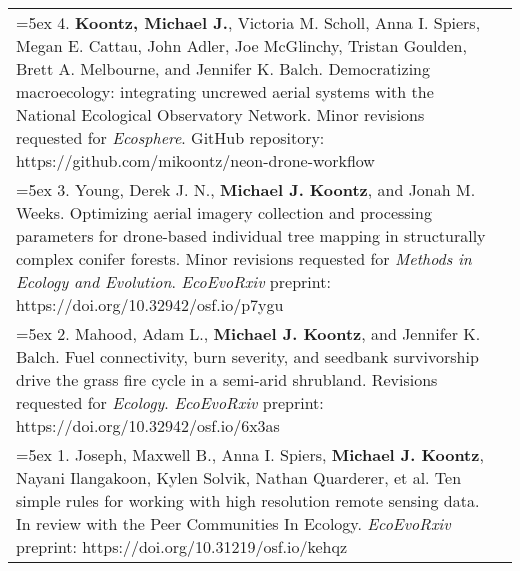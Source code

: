 \begin{longtable}{@{} >{\raggedright}p{6.10in} >{\raggedleft}X @{}}

\hangindent=5ex 4. \textbf{Koontz, Michael J.}, Victoria M. Scholl, Anna I. Spiers, Megan E. Cattau, John Adler, Joe McGlinchy, Tristan Goulden, Brett A. Melbourne, and Jennifer K. Balch. Democratizing macroecology: integrating uncrewed aerial systems with the National Ecological Observatory Network. Minor revisions requested for \emph{Ecosphere}. 
\newline GitHub repository: https://github.com/mikoontz/neon-drone-workflow & \tabularnewline

\hangindent=5ex 3. Young, Derek J. N., \textbf{Michael J. Koontz}, and Jonah M. Weeks. Optimizing aerial imagery collection and processing parameters for drone-based individual tree mapping in structurally complex conifer forests. Minor revisions requested for \emph{Methods in Ecology and Evolution}.
\newline \emph{EcoEvoRxiv} preprint: https://doi.org/10.32942/osf.io/p7ygu & \tabularnewline

\hangindent=5ex 2. Mahood, Adam L., \textbf{Michael J. Koontz}, and Jennifer K. Balch. Fuel connectivity, burn severity, and seedbank survivorship drive the grass fire cycle in a semi-arid shrubland. Revisions requested for \emph{Ecology}. 
\newline \emph{EcoEvoRxiv} preprint: https://doi.org/10.32942/osf.io/6x3as & \tabularnewline

\hangindent=5ex 1. Joseph, Maxwell B., Anna I. Spiers, \textbf{Michael J. Koontz}, Nayani Ilangakoon, Kylen Solvik, Nathan Quarderer, et al. Ten simple rules for working with high resolution remote sensing data. In review with the Peer Communities In Ecology.
\newline \emph{EcoEvoRxiv} preprint: https://doi.org/10.31219/osf.io/kehqz & \tabularnewline


\end{longtable}
